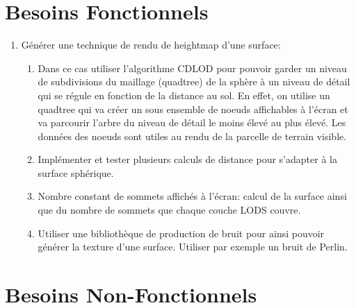 \documentclass[12pt]{report}
\begin{document}
\section{Besoins Fonctionnels}

\begin{enumerate}
 \item Générer une technique de rendu de heightmap d'une surface:
    \begin{enumerate}
        \item  Dans ce cas utiliser l'algorithme CDLOD pour pouvoir garder un niveau de subdivisions du maillage (quadtree) de la sphère à un niveau de détail qui se régule en fonction de la distance au sol. En effet, on utilise un quadtree qui va créer un sous ensemble de noeuds affichables à l'écran et va parcourir l'arbre du niveau de détail le moins élevé au plus élevé. Les données des noeuds sont utiles au rendu de la parcelle de terrain visible.
        
        \item Implémenter et tester plusieurs calculs de distance pour s'adapter à la surface sphérique.
        
        \item Nombre constant de sommets affichés à l'écran:
        calcul de la surface ainsi que du nombre de sommets que chaque couche LODS couvre.
        
        \item Utiliser une bibliothèque de production de bruit pour ainsi pouvoir générer la texture d'une surface. Utiliser par exemple un bruit de Perlin.
    \end{enumerate}
\end{enumerate}

\newpage

\section{Besoins Non-Fonctionnels}
\end{document}
